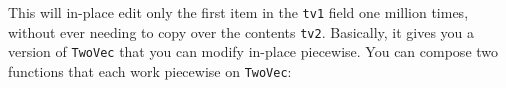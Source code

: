 \documentclass[]{article}
\newenvironment{Shaded}{}{}
\newcommand{\DataTypeTok}[1]{\textcolor[rgb]{0.56,0.13,0.00}{#1}}
\newcommand{\DecValTok}[1]{\textcolor[rgb]{0.25,0.63,0.44}{#1}}
\newcommand{\KeywordTok}[1]{\textcolor[rgb]{0.00,0.44,0.13}{\textbf{#1}}}
\newcommand{\NormalTok}[1]{#1}
\newcommand{\OperatorTok}[1]{\textcolor[rgb]{0.40,0.40,0.40}{#1}}
\newcommand{\OtherTok}[1]{\textcolor[rgb]{0.00,0.44,0.13}{#1}}
\begin{document}
\begin{Shaded}
\end{Shaded}

This will in-place edit only the first item in the \texttt{tv1} field one
million times, without ever needing to copy over the contents \texttt{tv2}.
Basically, it gives you a version of \texttt{TwoVec} that you can modify
in-place piecewise. You can compose two functions that each work piecewise on
\texttt{TwoVec}:
\end{document}
